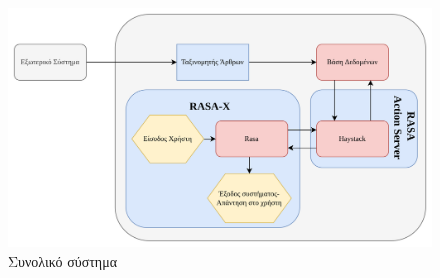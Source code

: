 \begin{figure}[!ht]
  \centering
  \captionsetup{justification=centering}
  \includegraphics[width=1\textwidth]{images/chapter4/qasystem.png}
  \caption{Συνολικό σύστημα}
  \label{fig:qasystem}
\end{figure}
\noindent
